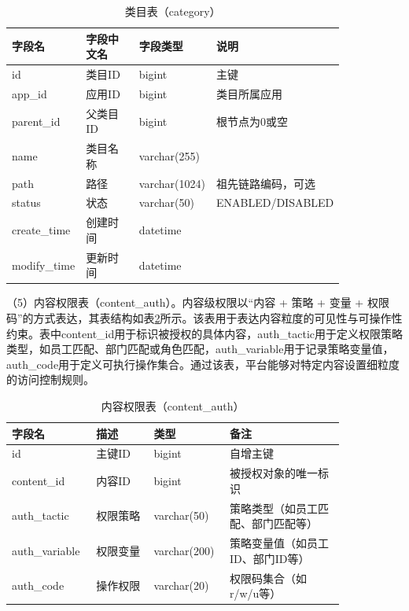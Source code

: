 \begin{table}[!htbp]
  \centering
  \caption{类目表（category）}
  \label{tab:db_category}
  \small
  \begin{tabular}{>{\raggedright\arraybackslash}p{0.20\linewidth}|>{\raggedright\arraybackslash}p{0.16\linewidth}|>{\raggedright\arraybackslash}p{0.16\linewidth}|>{\raggedright\arraybackslash}p{0.32\linewidth}}
    \hline
    字段名 & 字段中文名 & 字段类型 & 说明 \\ \hline
    id & 类目ID & bigint & 主键 \\ \hline
    app\_id & 应用ID & bigint & 类目所属应用 \\ \hline
    parent\_id & 父类目ID & bigint & 根节点为0或空 \\ \hline
    name & 类目名称 & varchar(255) & \\ \hline
    path & 路径 & varchar(1024) & 祖先链路编码，可选 \\ \hline
    status & 状态 & varchar(50) & ENABLED/DISABLED \\ \hline
    create\_time & 创建时间 & datetime & \\ \hline
    modify\_time & 更新时间 & datetime & \\ \hline
  \end{tabular}
\end{table}

\FloatBarrier

（5）内容权限表（content\_auth）。内容级权限以“内容 + 策略 + 变量 + 权限码”的方式表达，其表结构如表\ref{tab:db_content_auth}所示。该表用于表达内容粒度的可见性与可操作性约束。表中content\_\allowbreak id用于标识被授权的具体内容，auth\_\allowbreak tactic用于定义权限策略类型，如员工匹配、部门匹配或角色匹配，auth\_\allowbreak variable用于记录策略变量值，auth\_\allowbreak code用于定义可执行操作集合。通过该表，平台能够对特定内容设置细粒度的访问控制规则。

\begin{table}[!htbp]
  \centering
  \caption{内容权限表（content\_auth）}
  \label{tab:db_content_auth}
  \small
  \begin{tabular}{>{\raggedright\arraybackslash}p{0.20\linewidth}|>{\raggedright\arraybackslash}p{0.16\linewidth}|>{\raggedright\arraybackslash}p{0.16\linewidth}|>{\raggedright\arraybackslash}p{0.32\linewidth}}
    \hline
    字段名 & 描述 & 类型 & 备注 \\ \hline
    id & 主键ID & bigint & 自增主键 \\ \hline
    content\_id & 内容ID & bigint & 被授权对象的唯一标识 \\ \hline
    auth\_tactic & 权限策略 & varchar(50) & 策略类型（如员工匹配、部门匹配等） \\ \hline
    auth\_variable & 权限变量 & varchar(200) & 策略变量值（如员工ID、部门ID等） \\ \hline
    auth\_code & 操作权限 & varchar(20) & 权限码集合（如r/w/u等） \\ \hline
  \end{tabular}
\end{table}

